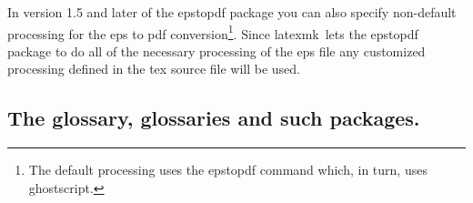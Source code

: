 \documentclass[11pt]{article}
\newcommand{\cmd}[1]{\textsf{#1}}
\newcommand{\latexmk}{\textsf{latexmk}}
\begin{document}

In version 1.5 and later of the \cmd{epstopdf} package you can also specify non-default processing for the \cmd{eps} to \cmd{pdf} conversion\footnote{The default processing uses the \cmd{epstopdf} command which, in turn, uses \cmd{ghostscript}.}. Since \latexmk\ lets the \cmd{epstopdf} package to do all of the necessary processing of the \cmd{eps} file any customized processing defined in the \cmd{tex} source file will be used.


\subsection{The \cmd{glossary}, \cmd{glossaries} and such packages.}
\end{document}
